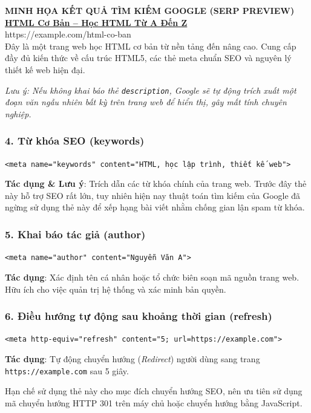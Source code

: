 \documentclass[11pt,oneside]{book}
\newcommand{\codeinline}[1]{\textcolor{accentOrange}{\texttt{#1}}}
\begin{document}
\begin{tcolorbox}[
    enhanced,
    width=\linewidth,
    colback=white,
    colframe=codeBorder,
    arc=6pt,
    boxrule=0.8pt,
    top=10pt, bottom=10pt, left=14pt, right=14pt,
    drop shadow=black!3!white
]
{\sffamily\bfseries\scriptsize\color{codeComment} MINH HỌA KẾT QUẢ TÌM KIẾM GOOGLE (SERP PREVIEW)}\\[4pt]
{\sffamily\bfseries\Large\color{primaryBlue} \underline{HTML Cơ Bản -- Học HTML Từ A Đến Z}}\\[3pt]
{\sffamily\small\color{codeString} https://example.com/html-co-ban}\\[6pt]
{\sffamily\small\color{darkText} Đây là một trang web học HTML cơ bản từ nền tảng đến nâng cao. Cung cấp đầy đủ kiến thức về cấu trúc HTML5, các thẻ meta chuẩn SEO và nguyên lý thiết kế web hiện đại.}
\end{tcolorbox}

\textit{Lưu ý: Nếu không khai báo thẻ \codeinline{description}, Google sẽ tự động trích xuất một đoạn văn ngẫu nhiên bất kỳ trên trang web để hiển thị, gây mất tính chuyên nghiệp.}

\subsubsection{4. Từ khóa SEO (keywords)}
\begin{center}
\codeinline{<meta name="keywords" content="HTML, học lập trình, thiết kế web">}
\end{center}
\textbf{Tác dụng \& Lưu ý}: Trích dẫn các từ khóa chính của trang web. Trước đây thẻ này hỗ trợ SEO rất lớn, tuy nhiên hiện nay thuật toán tìm kiếm của Google đã ngừng sử dụng thẻ này để xếp hạng bài viết nhằm chống gian lận spam từ khóa.

\subsubsection{5. Khai báo tác giả (author)}
\begin{center}
\codeinline{<meta name="author" content="Nguyễn Văn A">}
\end{center}
\textbf{Tác dụng}: Xác định tên cá nhân hoặc tổ chức biên soạn mã nguồn trang web. Hữu ích cho việc quản trị hệ thống và xác minh bản quyền.

\subsubsection{6. Điều hướng tự động sau khoảng thời gian (refresh)}
\begin{center}
\codeinline{<meta http-equiv="refresh" content="5; url=https://example.com">}
\end{center}
\textbf{Tác dụng}: Tự động chuyển hướng (\textit{Redirect}) người dùng sang trang \codeinline{https://example.com} sau 5 giây. 
\begin{warnBox}
Hạn chế sử dụng thẻ này cho mục đích chuyển hướng SEO, nên ưu tiên sử dụng mã chuyển hướng HTTP 301 trên máy chủ hoặc chuyển hướng bằng JavaScript.
\end{warnBox}
\end{document}
